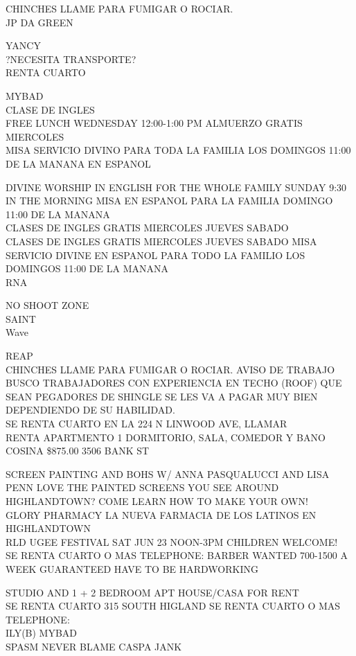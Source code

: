 \documentclass[10pt,letterpaper]{article}
\begin{document}
CHINCHES LLAME PARA FUMIGAR O ROCIAR.\\
JP DA GREEN

YANCY\\
?NECESITA TRANSPORTE?\\
RENTA CUARTO

MYBAD\\
CLASE DE INGLES\\
FREE LUNCH WEDNESDAY 12:00{-}1:00 PM ALMUERZO GRATIS MIERCOLES\\
MISA SERVICIO DIVINO PARA TODA LA FAMILIA LOS DOMINGOS 11:00 DE LA MANANA EN ESPANOL

DIVINE WORSHIP IN ENGLISH FOR THE WHOLE FAMILY SUNDAY 9:30 IN THE MORNING MISA EN ESPANOL PARA LA FAMILIA DOMINGO 11:00 DE LA MANANA\\
CLASES DE INGLES GRATIS MIERCOLES JUEVES SABADO\\
CLASES DE INGLES GRATIS MIERCOLES JUEVES SABADO MISA SERVICIO DIVINE EN ESPANOL PARA TODO LA FAMILIO LOS DOMINGOS 11:00 DE LA MANANA\\
RNA

NO SHOOT ZONE\\
SAINT\\
Wave

REAP\\
CHINCHES LLAME PARA FUMIGAR O ROCIAR. AVISO DE TRABAJO BUSCO TRABAJADORES CON EXPERIENCIA EN TECHO (ROOF) QUE SEAN PEGADORES DE SHINGLE SE LES VA A PAGAR MUY BIEN DEPENDIENDO DE SU HABILIDAD.\\
SE RENTA CUARTO EN LA 224 N LINWOOD AVE, LLAMAR\\
RENTA APARTMENTO 1 DORMITORIO, SALA, COMEDOR Y BANO COSINA \$875.00 3506 BANK ST

SCREEN PAINTING AND BOHS W/ ANNA PASQUALUCCI AND LISA PENN LOVE THE PAINTED SCREENS YOU SEE AROUND HIGHLANDTOWN?  COME LEARN HOW TO MAKE YOUR OWN!\\
GLORY PHARMACY LA NUEVA FARMACIA DE LOS LATINOS EN HIGHLANDTOWN\\
RLD UGEE FESTIVAL SAT JUN 23 NOON{-}3PM CHILDREN WELCOME!\\
SE RENTA CUARTO O MAS TELEPHONE: BARBER WANTED 700{-}1500 A WEEK GUARANTEED HAVE TO BE HARDWORKING

STUDIO AND 1 + 2 BEDROOM APT HOUSE/CASA FOR RENT\\
SE RENTA CUARTO 315 SOUTH HIGLAND SE RENTA CUARTO O MAS TELEPHONE:\\
ILY(B) MYBAD\\
SPASM NEVER BLAME CASPA JANK
\end{document}
